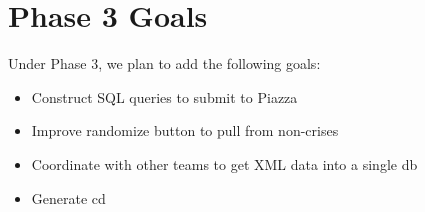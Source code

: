 \documentclass[12pt]{report}
\begin{document}
\newpage
\section*{Phase 3 Goals}
\hfill

Under Phase 3, we plan to add the following goals:
\begin{itemize}
\item Construct SQL queries to submit to Piazza
\item Improve randomize button to pull from non-crises
\item Coordinate with other teams to get XML data into a single db
\item Generate cd 
\end{itemize}
\end{document}

